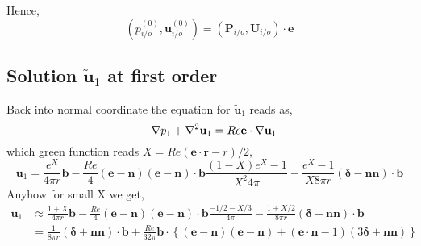 Hence,
\begin{equation}
    (p^{(0)}_{i/o}, \textbf{u}^{(0)}_{i/o}) = (\textbf{P}_{i/o}, \textbf{U}_{i/o}) \cdot \textbf{e}
\end{equation}

\subsection{Solution $\widetilde{\textbf{u}}_1$ at first order}

Back into normal coordinate the equation for $\widetilde{\textbf{u}}_1$ reads as,
\begin{equation}
    - {\mathbf{\nabla}} {p}_1 +  {\mathbf{\nabla}}^2 {\textbf{u}}_1
    =
     Re \textbf{e} \cdot {\mathbf{\nabla}} {\textbf{u}}_1
\end{equation}
which green function reads $X = Re (\textbf{e}\cdot \textbf{r} - r)/2$,
\begin{equation}
    \textbf{u}_1 =
    \frac{e^X}{4\pi r} \textbf{b}
    -
    \frac{Re}{4}(\textbf{e} - \textbf{n})
    (\textbf{e} - \textbf{n})\cdot \textbf{b}
    \frac{(1-X) e^X - 1}{X^2 4 \pi}
    - \frac{e^X- 1}{X 8 \pi r}  (\bm\delta  - \textbf{nn} )\cdot \textbf{b}
\end{equation}
Anyhow for small X we get,
\begin{align}
    \textbf{u}_1 &\approx
    \frac{1+X}{4\pi r} \textbf{b}
    -
    \frac{Re}{4}(\textbf{e} - \textbf{n})
    (\textbf{e} - \textbf{n})\cdot \textbf{b}
    \frac{-1/2-X/3}{ 4 \pi}
    - \frac{1+X/2}{8 \pi r}  (\bm\delta  - \textbf{nn} )\cdot \textbf{b}\\
    &=\frac{1}{8 \pi r}  (\bm\delta  + \textbf{nn} )\cdot \textbf{b} +
     \frac{Re}{32\pi }\textbf{b}\cdot \left\{
         (\textbf{e} - \textbf{n})
        (\textbf{e} - \textbf{n})
        +(\textbf{e}\cdot \textbf{n} - 1)  (3\bm\delta  + \textbf{nn} )
    \right\}
\end{align}
